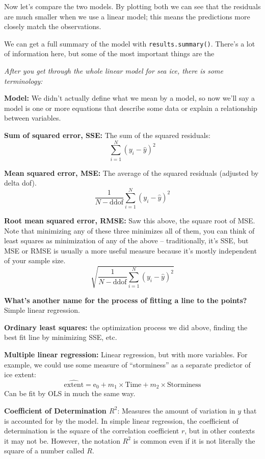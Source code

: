 \documentclass{article}
\begin{document}
Now let's compare the two models. By plotting both we can see that the residuals are much smaller when we use a linear model; this means the predictions more closely match the observations.

We can get a full summary of the model with \texttt{results.summary()}. There's a lot of information here, but some of the most important things are the 

\textit{After you get through the whole linear model for sea ice, there is some terminology:}

\textbf{Model:} We didn't actually define what we mean by a model, so now we'll say a model is one or more equations that describe some data or explain a relationship between variables.

\textbf{Sum of squared error, SSE:} The sum of the squared residuals:
\[
    \sum_{i=1}^N (y_i - \hat y)^2
\]

\textbf{Mean squared error, MSE:} The average of the squared residuals (adjusted by delta dof). 
\[
    \frac{1}{N - \mathrm{ddof}}\sum_{i=1}^N (y_i - \hat y)^2
\]

\textbf{Root mean squared error, RMSE:} Saw this above, the square root of MSE. Note that minimizing any of these three minimizes all of them, you can think of least squares as minimization of any of the above -- traditionally, it's SSE, but MSE or RMSE is usually a more useful measure because it's mostly independent of your sample size.
\[
    \sqrt{\frac{1}{N - \mathrm{ddof}}\sum_{i=1}^N (y_i - \hat y)^2}
\]

\textbf{What's another name for the process of fitting a line to the points?} Simple linear regression.

\textbf{Ordinary least squares:} the optimization process we did above, finding the best fit line by minimizing SSE, etc.

\textbf{Multiple linear regression:} Linear regression, but with more variables. For example, we could use some measure of ``storminess'' as a separate predictor of ice extent:
\[
    \widehat{\mathrm{extent}} = \mathrm{e_0} + m_1 \times \mathrm{Time} + m_2 \times \mathrm{Storminess}
\]
Can be fit by OLS in much the same way.

\textbf{Coefficient of Determination $R^2$}: Measures the amount of variation in $y$ that is accounted for by the model. In simple linear regression, the coefficient of determination is the square of the correlation coefficient $r$, but in other contexts it may not be. However, the notation $R^2$ is common even if it is not literally the square of a number called $R$.
\end{document}
